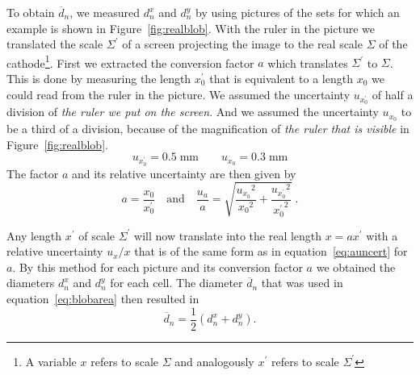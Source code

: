 \documentclass[a4paper,10pt,twocolumn]{article}
\begin{document}
\begin{extract*}
\begin{multicols}{2}
To obtain $\overline{d}_n$, we measured $d_n^x$ and $d_n^y$ by using pictures of the sets for which an example is shown in Figure~\ref{fig:realblob}. With the ruler in the picture we translated the scale $\Sigma^\prime$ of a screen projecting the image to the real scale $\Sigma$ of the cathode\footnote{A variable $x$ refers to scale $\Sigma$ and analogously $x^\prime$ refers to scale $\Sigma^\prime$}.\mypar
First we extracted the conversion factor $a$ which translates $\Sigma^\prime$ to $\Sigma$. This is done by measuring the length $x_0^\prime$ that is equivalent to a length $x_0$ we could read from the ruler in the picture. We assumed the uncertainty $u_{x_0^\prime}$ of half a division of \emph{the ruler we put on the screen}. And we assumed the uncertainty $u_{x_0}$ to be a third of a division, because of the magnification of \emph{the ruler that is visible} in Figure~\ref{fig:realblob}.
\begin{equation*}
	u_{x_0^\prime} = 0.5 \;\mathrm{mm} \qquad u_{x_0} = 0.3 \;\mathrm{mm}
\end{equation*}
The factor $a$ and its relative uncertainty are then given by
\begin{equation}\label{eq:auncert}
	a=\frac{x_0}{x_0^\prime} \quad \text{and} \quad \frac{u_a}{a} = \sqrt{\frac{{u_{x_0}}^2}{{x_0}^2}+\frac{{u_{x_0^\prime}}^2}{{x_0^\prime}^2}}\;.
\end{equation}

Any length $x^\prime$ of scale $\Sigma^\prime$ will now translate into the real length $x = a x^\prime$ with a relative uncertainty $u_x/x$ that is of the same form as in equation~\ref{eq:auncert} for $a$.\mypar
By this method for each picture and its conversion factor $a$ we obtained the diameters $d^x_n$ and $d^y_n$ for each cell. The diameter $\overline{d}_n$ that was used in equation~\ref{eq:blobarea} then resulted in
\begin{equation}
	\overline{d}_n = \frac{1}{2} (d_n^x + d_n^y ).
\end{equation}

\end{multicols}

\clearpage
\twocolumn 


\end{extract*}
\end{document}
